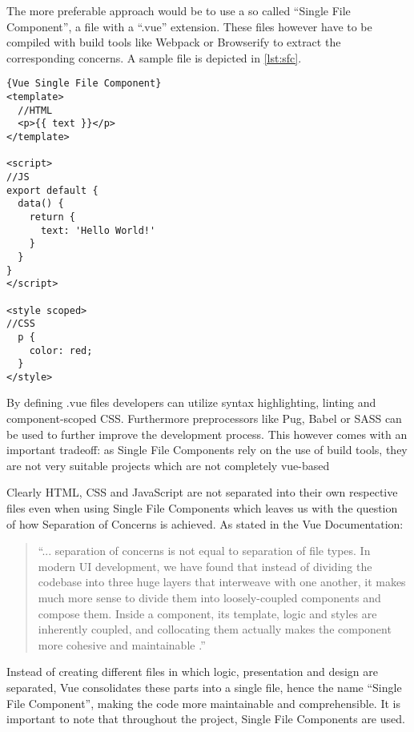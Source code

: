 The more preferable approach would be to use a so called “Single File Component”, a file with a “.vue” extension. These files however have to be compiled with build tools like Webpack or Browserify to extract the corresponding concerns. A sample file is depicted in \autoref{lst:sfc}. \newline

\begin{lstlisting}[caption=Vue Single File Component, label={lst:sfc}, captionpos=b, style=htmlcssjs]{Vue Single File Component}
<template>
  //HTML
  <p>{{ text }}</p>
</template>

<script>
//JS
export default {
  data() {
    return {
      text: 'Hello World!'
    }
  }
}
</script>

<style scoped>
//CSS
  p {
    color: red;
  }
</style>
\end{lstlisting}

By defining .vue files developers can utilize syntax highlighting, linting and component-scoped CSS. Furthermore preprocessors like Pug, Babel or SASS can be used to further improve the development process. This however comes with an important tradeoff: as Single File Components rely on the use of build tools, they are not very suitable projects which are not completely vue-based

Clearly HTML, CSS and JavaScript are not separated into their own respective files even when using Single File Components which leaves us with the question of how Separation of Concerns is achieved. As stated in the Vue Documentation: 

\begin{quotation}
“... separation of concerns is not equal to separation of file types. In modern UI development, we have found that instead of dividing the codebase into three huge layers that interweave with one another, it makes much more sense to divide them into loosely-coupled components and compose them. Inside a component, its template, logic and styles are inherently coupled, and collocating them actually makes the component more cohesive and maintainable \cite{VueSeparationofConcerns:online}.” 
\end{quotation}

Instead of creating different files in which logic, presentation and design are separated, Vue consolidates these parts into a single file, hence the name “Single File Component”, making the code more maintainable and comprehensible. It is important to note that throughout the project, Single File Components are used. 

